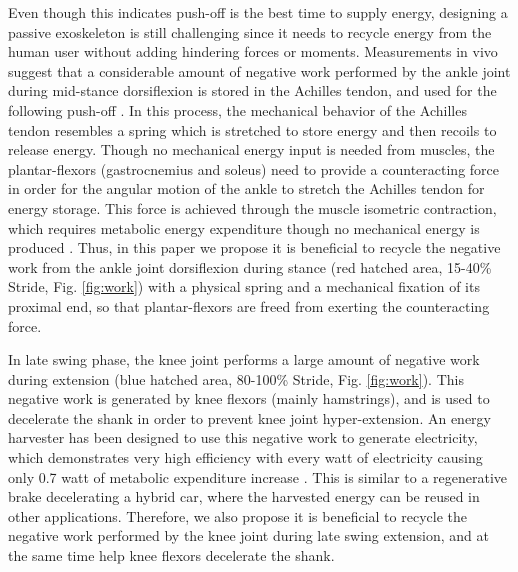 \documentclass[twocolumn,cleanfoot,10pt]{asme2ej}
\begin{document}
Even though this indicates push-off is the best time to supply energy, designing a passive exoskeleton is still challenging since it needs to recycle energy from the human user without adding hindering forces or moments.
Measurements in vivo suggest that a considerable amount of negative work performed by the ankle joint during mid-stance dorsiflexion is stored in the Achilles tendon, and used for the following push-off \cite{RN16}.
In this process, the mechanical behavior of the Achilles tendon resembles a spring which is stretched to store energy and then recoils to release energy.
Though no mechanical energy input is needed from muscles, the plantar-flexors (gastrocnemius and soleus) need to provide a counteracting force in order for the angular motion of the ankle to stretch the Achilles tendon for energy storage.
This force is achieved through the muscle isometric contraction, which requires metabolic energy expenditure though no mechanical energy is produced \cite{RN17}.
Thus, in this paper we propose it is beneficial to recycle the negative work from the ankle joint dorsiflexion during stance (red hatched area, 15-40\% Stride, Fig. \ref{fig:work}) with a physical spring and a mechanical fixation of its proximal end, so that plantar-flexors are freed from exerting the counteracting force.

In late swing phase, the knee joint performs a large amount of negative work during extension (blue hatched area, 80-100\% Stride, Fig. \ref{fig:work}).
This negative work is generated by knee flexors (mainly hamstrings), and is used to decelerate the shank in order to prevent knee joint hyper-extension.
An energy harvester has been designed to use this negative work to generate electricity, which demonstrates very high efficiency with every watt of electricity causing only 0.7 watt of metabolic expenditure increase \cite{RN18}.
This is similar to a regenerative brake decelerating a hybrid car, where the harvested energy can be reused in other applications.
Therefore, we also propose it is beneficial to recycle the negative work performed by the knee joint during late swing extension, and at the same time help knee flexors decelerate the shank.
\end{document}
